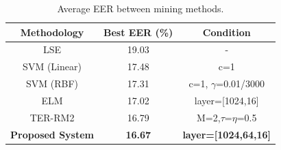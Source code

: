 \begin{table}[!h]
    \caption{Average EER between mining methods.}\label{tab_mining}
    \centering
    \begin{tabular}{|c|c|c|}
    \hline
    Methodology   &   Best EER (\%) &   Condition   \\  \hline
    LSE &   19.03   &  - \\ 
    SVM (Linear) &   17.48   &   c=1 \\
    SVM (RBF)    &   17.31   &   c=1, $\gamma$=0.01/3000 \\
    ELM &   17.02   &   layer=[1024,16] \\
    TER-RM2 &   16.79   &  M=2,$\tau$=$\eta$=0.5   \\     \hline
    \textbf{Proposed System} &   \textbf{16.67}   &  \textbf{layer=[1024,64,16]}  \\
     \hline
    \end{tabular}
\end{table}